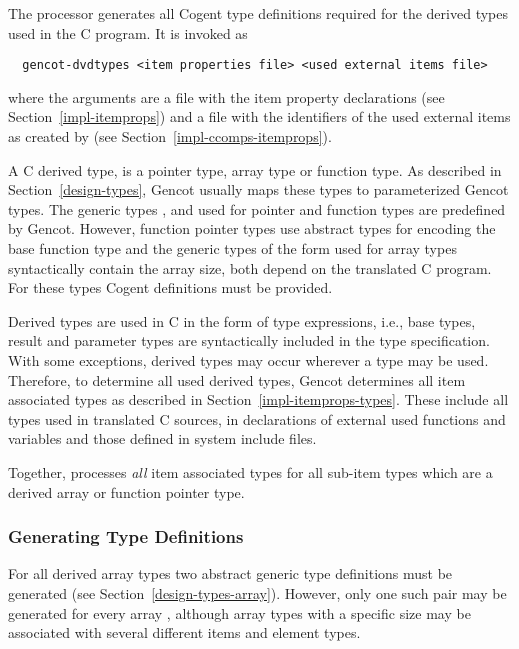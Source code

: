 The processor  generates all Cogent type definitions required for the derived types
used in the C program. It is invoked as
\begin{verbatim}
  gencot-dvdtypes <item properties file> <used external items file>
\end{verbatim}
where the arguments are a file with the item property declarations (see 
Section~\ref{impl-itemprops}) and a file with the identifiers of the used external items as created 
by  (see Section~\ref{impl-ccomps-itemprops}).

A C derived type, is a pointer type, array type or function type. As described in 
Section~\ref{design-types}, Gencot usually maps these types to parameterized Gencot types. The generic types ,
 and  used for pointer and function types are predefined by Gencot. However, function
pointer types use abstract types for encoding the base function type and the generic 
types of the form  used for array types syntactically contain the array size, both
depend on the translated C program. For these types Cogent definitions must be provided.

Derived types are used in C in the form of type expressions, i.e., base types, result and parameter types are 
syntactically included in the type specification. With some exceptions, derived types may occur wherever a type
may be used. Therefore, to determine all used derived types, Gencot determines all item associated types as
described in Section~\ref{impl-itemprops-types}. These include all types used 
in translated C sources, in declarations of external used functions and variables and those defined in system
include files.

Together,  processes
\textit{all} item associated types for all sub-item types which are a derived array or function pointer type.

\subsubsection{Generating Type Definitions}

For all derived array types two abstract generic type definitions must be generated
(see Section~\ref{design-types-array}). However, only one such pair may be generated for every array , 
although array types with a specific size may be associated with several different items and element types.

